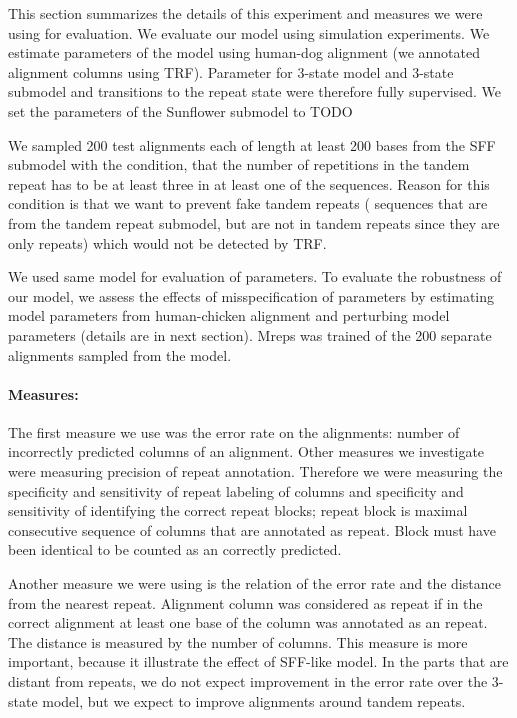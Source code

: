 This section summarizes the details of this experiment and measures we were
using for evaluation. We evaluate our model using simulation experiments.  We
estimate parameters of the model using human-dog alignment (we annotated
alignment columns using TRF). Parameter for 3-state model and 3-state submodel
and transitions to the repeat state were therefore fully supervised.
We set the parameters of the Sunflower submodel to TODO

We sampled 200 test alignments each of length at least 200 bases 
from the SFF submodel with the condition, that the number of repetitions in the
tandem repeat has to be at least three in at least one of the sequences. Reason
for this condition is that we want to prevent fake tandem repeats ( sequences
that are from the tandem repeat submodel, but are not in tandem repeats since
they are only repeats) which would not be detected by TRF.

We used same model for evaluation of parameters. To evaluate the robustness of
our model, we assess the effects of misspecification of parameters by
estimating model parameters from human-chicken alignment and perturbing model
parameters (details are in next section). Mreps was trained of the 200 separate
alignments sampled from the model. 

\paragraph{Measures:} The first measure we use was the error rate on the
alignments: number of incorrectly predicted columns of an alignment. Other
measures we investigate were measuring precision of repeat annotation.
Therefore we were measuring the specificity and sensitivity of repeat labeling
of columns and specificity and sensitivity of identifying the correct repeat
blocks; repeat block is maximal consecutive sequence of columns that are
annotated as repeat. Block must have been identical to be counted as an
correctly predicted.

Another measure we were using is the relation of the error rate and the
distance from the nearest repeat. Alignment column was considered as repeat if
in the correct alignment at least one base of the column was annotated as an
repeat. The distance is measured by the number of columns. This measure is more
important, because it illustrate the effect of SFF-like model. In the parts
that are distant from repeats, we do not expect improvement in the error rate
over the 3-state model, but we expect to improve alignments around tandem
repeats. 

